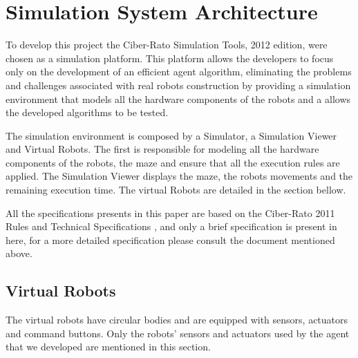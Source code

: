 \documentclass[oribibl]{llncs}
\begin{document}
\section{Simulation System Architecture}
To develop this project the Ciber-Rato Simulation Tools, 2012 edition, were chosen as a simulation platform. This platform allows the developers to focus only on the development of an efficient agent algorithm, eliminating the problems and challenges associated with real robots construction by providing a simulation environment that models all the hardware components of the robots and a allows the developed algorithms to be tested\cite{Lau2002}. 

The simulation environment is composed by a Simulator, a Simulation Viewer and Virtual Robots. The first is responsible for modeling all the hardware components of the robots, the maze and ensure that all the execution rules are applied. The Simulation Viewer displays the maze, the robots movements and the remaining execution time. The virtual Robots are detailed in the section bellow.

All the specifications presents in this paper are based on the Ciber-Rato 2011 Rules and Technical Specifications \cite{DepartamentodeElectronica2011}, and only a brief specification is present in here, for a more detailed specification please consult the document mentioned above.

\subsection{Virtual Robots}
The virtual robots have circular bodies and are equipped with sensors, actuators and command buttons. Only the robots' sensors and actuators used by the agent that we developed are mentioned in this section.
\end{document}
